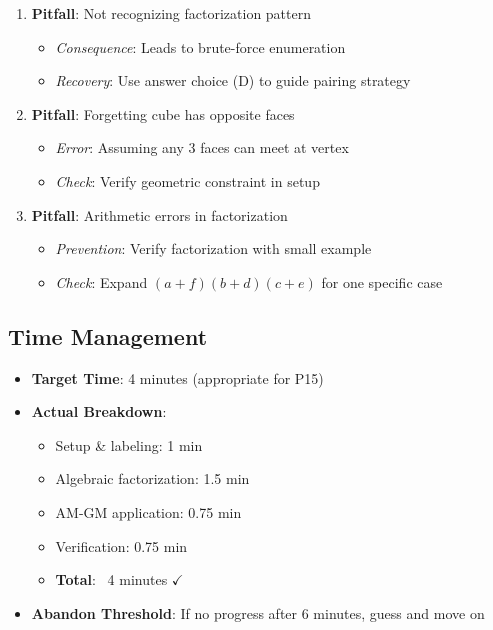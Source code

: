 \documentclass[]{article}
\begin{document}
\begin{solutionbox}
\begin{enumerate}
    \item \textbf{Pitfall}: Not recognizing factorization pattern
    \begin{itemize}
        \item \textit{Consequence}: Leads to brute-force enumeration
        \item \textit{Recovery}: Use answer choice (D) to guide pairing strategy
    \end{itemize}
    
    \item \textbf{Pitfall}: Forgetting cube has opposite faces
    \begin{itemize}
        \item \textit{Error}: Assuming any 3 faces can meet at vertex
        \item \textit{Check}: Verify geometric constraint in setup
    \end{itemize}
    
    \item \textbf{Pitfall}: Arithmetic errors in factorization
    \begin{itemize}
        \item \textit{Prevention}: Verify factorization with small example
        \item \textit{Check}: Expand $(a+f)(b+d)(c+e)$ for one specific case
    \end{itemize}
\end{enumerate}

\subsection*{Time Management}
\begin{itemize}
    \item \textbf{Target Time}: 4 minutes (appropriate for P15)
    \item \textbf{Actual Breakdown}:
    \begin{itemize}
        \item Setup \& labeling: 1 min
        \item Algebraic factorization: 1.5 min
        \item AM-GM application: 0.75 min
        \item Verification: 0.75 min
        \item \textbf{Total}: ~4 minutes $\checkmark$
    \end{itemize}
    \item \textbf{Abandon Threshold}: If no progress after 6 minutes, guess and move on
\end{itemize}
\end{solutionbox}
\end{document}
